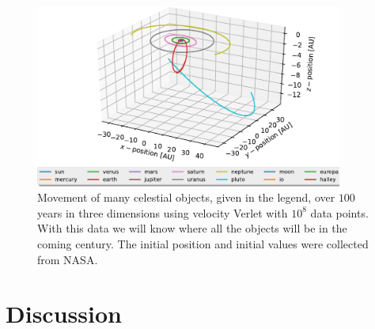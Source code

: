 \documentclass[%
 reprint,
nofootinbib,
aps,
]{revtex4-1}
\begin{document}
\begin{figure}
  \centering
  \includegraphics[width=0.9\textwidth]{../figures/total_plot.pdf}
  \caption{Movement of many celestial objects, given in the legend, over $100$ years in three dimensions using velocity Verlet with $10^8$ data points. With this data we will know where all the objects will be in the coming century. The initial position and initial values were collected from NASA.}
  \label{fig:total_plot}
\end{figure}

\section{Discussion}
\end{document}
